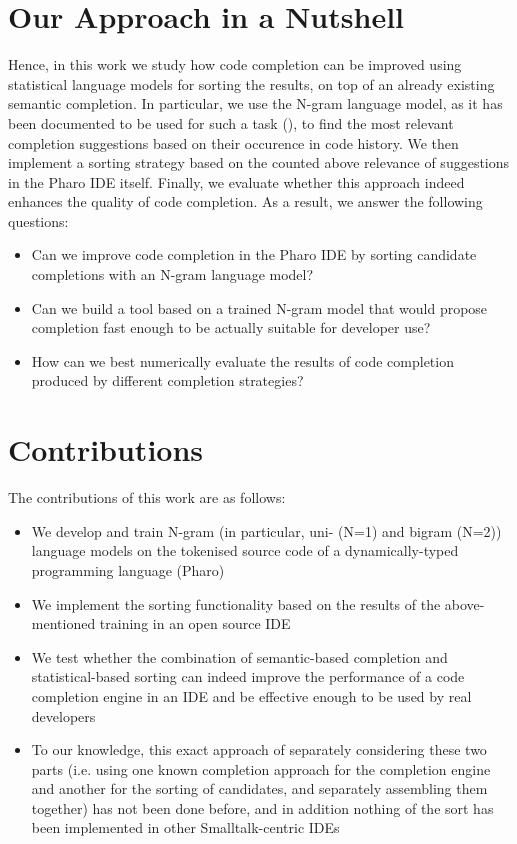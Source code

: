 \section{Our Approach in a Nutshell}
\label{sec:Introduction-Approach}
Hence, in this work we study how code completion can be improved using statistical language models for sorting the results, on top of an already existing semantic completion. In particular, we use the N-gram language model, as it has been documented to be used for such a task (\cite{Hind12a}), to find the most relevant completion suggestions based on their occurence in code history. We then implement a sorting strategy based on the counted above relevance of suggestions in the Pharo IDE itself. Finally, we evaluate whether this approach indeed enhances the quality of code completion. As a result, we answer the following questions:
\begin{itemize}
    \item Can we improve code completion in the Pharo IDE by sorting candidate completions with an N-gram language model?
    \item Can we build a tool based on a trained N-gram model that would propose completion fast enough to be actually suitable for developer use? 
    \item How can we best numerically evaluate the results of code completion produced by different completion strategies?
\end{itemize}

\section{Contributions}
\label{sec:Introduction-Contributions}
The contributions of this work are as follows:
\begin{itemize}
    \item We develop and train N-gram (in particular, uni- (N=1) and bigram (N=2)) language models on the tokenised source code of a dynamically-typed programming language (Pharo)
    \item We implement the sorting functionality based on the results of the above-mentioned training in an open source IDE
    \item We test whether the combination of semantic-based completion and statistical-based sorting can indeed improve the performance of a code completion engine in an IDE and be effective enough to be used by real developers
    \item To our knowledge, this exact approach of separately considering these two parts (i.e. using one known completion approach for the completion engine and another for the sorting of candidates, and separately assembling them together) has not been done before, and in addition nothing of the sort has been implemented in other Smalltalk-centric IDEs
\end{itemize}

